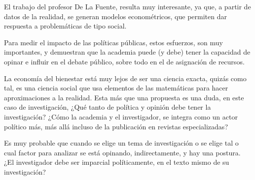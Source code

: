\documentclass{article}
\begin{document}
El trabajo del profesor De La Fuente, resulta muy interesante, ya que, a partir de datos de la realidad, se generan modelos econométricos, que permiten dar respuesta a problemáticas de tipo social.

Para medir el impacto de las políticas públicas, estos esfuerzos, son muy importantes, y demuestran que la academia puede (y debe) tener la capacidad de opinar e influir en el debate público, sobre todo en el de asignación de recursos.

La economía del bienestar está muy lejos de ser una ciencia exacta, quizás como tal, es una ciencia social que usa elementos de las matemáticas para hacer aproximaciones a la realidad. Esta más que una propuesta es una duda, en este caso de investigación, ¿Qué tanto de política y opinión debe tener la investigación? ¿Cómo la academia y el investigador, se integra como un actor político más, más allá incluso de la publicación en revistas especializadas?

Es muy probable que cuando se elige un tema de investigación o se elige tal o cual factor para analizar se está opinando, indirectamente, y hay una postura. ¿El investigador debe ser imparcial políticamente, en el texto mismo de su investigación?
\nocite{*}
    
\end{document}
